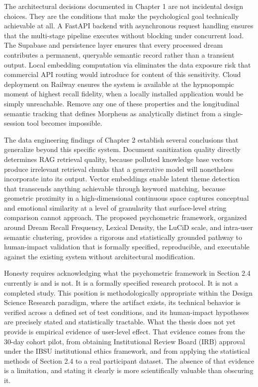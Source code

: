 \documentclass[12pt,a4paper]{report}
\DeclareRobustCommand{\code}[1]{\texttt{\detokenize{#1}}}
\begin{document}
The architectural decisions documented in Chapter 1 are not incidental design choices. They are the conditions that make the psychological goal technically achievable at all. A FastAPI backend with asynchronous request handling ensures that the multi-stage pipeline executes without blocking under concurrent load. The Supabase and \code{pgvector} persistence layer ensures that every processed dream contributes a permanent, queryable semantic record rather than a transient output. Local embedding computation via \code{sentence-transformers} eliminates the data exposure risk that commercial API routing would introduce for content of this sensitivity. Cloud deployment on Railway ensures the system is available at the hypnopompic moment of highest recall fidelity, when a locally installed application would be simply unreachable. Remove any one of these properties and the longitudinal semantic tracking that defines Morpheus as analytically distinct from a single-session tool becomes impossible.

The data engineering findings of Chapter 2 establish several conclusions that generalize beyond this specific system. Document sanitization quality directly determines RAG retrieval quality, because polluted knowledge base vectors produce irrelevant retrieval chunks that a generative model will nonetheless incorporate into its output. Vector embeddings enable latent theme detection that transcends anything achievable through keyword matching, because geometric proximity in a high-dimensional continuous space captures conceptual and emotional similarity at a level of granularity that surface-level string comparison cannot approach. The proposed psychometric framework, organized around Dream Recall Frequency, Lexical Density, the LuCiD scale, and intra-user semantic clustering, provides a rigorous and statistically grounded pathway to human-impact validation that is formally specified, reproducible, and executable against the existing system without architectural modification.

Honesty requires acknowledging what the psychometric framework in Section 2.4 currently is and is not. It is a formally specified research protocol. It is not a completed study. This position is methodologically appropriate within the Design Science Research paradigm, where the artifact exists, its technical behavior is verified across a defined set of test conditions, and its human-impact hypotheses are precisely stated and statistically tractable. What the thesis does not yet provide is empirical evidence of user-level effect. That evidence comes from the \num{30}-day cohort pilot, from obtaining Institutional Review Board (IRB) approval under the IBSU institutional ethics framework, and from applying the statistical methods of Section 2.4 to a real participant dataset. The absence of that evidence is a limitation, and stating it clearly is more scientifically valuable than obscuring it.
\end{document}
